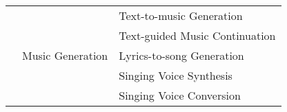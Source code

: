 \begin{longtable}{p{1.5cm}p{6cm}p{7cm}}
                     \cline{2-3} %
                         & \multirow{5}{*}{Music Generation} & Text-to-music Generation  \\
                         &                   & Text-guided Music Continuation   \\
                         &                   & Lyrics-to-song Generation           \\
                         &                   & Singing Voice Synthesis          \\
                         &                   & Singing Voice Conversion         \\
                         

\end{longtable}
